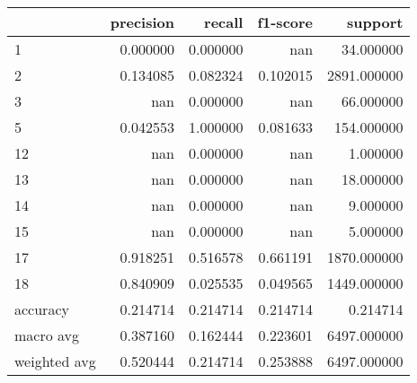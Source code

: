 \begin{tabular}{lrrrr}
\toprule
 & precision & recall & f1-score & support \\
\midrule
1 & 0.000000 & 0.000000 & nan & 34.000000 \\
2 & 0.134085 & 0.082324 & 0.102015 & 2891.000000 \\
3 & nan & 0.000000 & nan & 66.000000 \\
5 & 0.042553 & 1.000000 & 0.081633 & 154.000000 \\
12 & nan & 0.000000 & nan & 1.000000 \\
13 & nan & 0.000000 & nan & 18.000000 \\
14 & nan & 0.000000 & nan & 9.000000 \\
15 & nan & 0.000000 & nan & 5.000000 \\
17 & 0.918251 & 0.516578 & 0.661191 & 1870.000000 \\
18 & 0.840909 & 0.025535 & 0.049565 & 1449.000000 \\
accuracy & 0.214714 & 0.214714 & 0.214714 & 0.214714 \\
macro avg & 0.387160 & 0.162444 & 0.223601 & 6497.000000 \\
weighted avg & 0.520444 & 0.214714 & 0.253888 & 6497.000000 \\
\bottomrule
\end{tabular}
